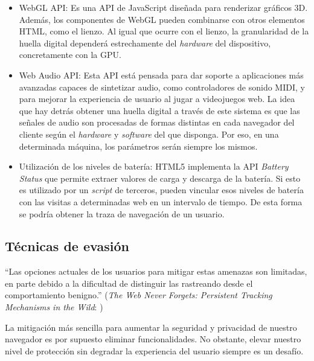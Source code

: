 \begin{itemize}
	\item WebGL API: Es una API de JavaScript diseñada para renderizar gráficos 3D. Además, los componentes de WebGL pueden combinarse con otros elementos HTML, como el lienzo\cite{canvas_paper}. Al igual que ocurre con el lienzo, la granularidad de la huella digital dependerá estrechamente del \textit{hardware} del dispositivo, concretamente con la GPU. \par 
	
	\item Web Audio API\cite{audio_w3c}: Esta API está pensada para dar soporte a aplicaciones más avanzadas capaces de sintetizar audio, como controladores de sonido MIDI, y para mejorar la experiencia de usuario al jugar a videojuegos web. La idea que hay detrás obtener una huella digital a través de este sistema es que las señales de audio son procesadas de formas distintas en cada navegador del cliente según el \textit{hardware} y \textit{software} del que disponga. Por eso, en una determinada máquina, los parámetros serán siempre los mismos. \par 
	
	\item Utilización de los niveles de batería: HTML5 implementa la API \textit{Battery Status} que permite extraer valores de carga y descarga de la batería. Si esto es utilizado por un \textit{script} de terceros, pueden vincular esos niveles de batería con las visitas a determinadas web en un intervalo de tiempo. De esta forma se podría obtener la traza de navegación de un usuario\cite{battery_paper}. \par 
	
\end{itemize}

\subsection{Técnicas de evasión}
``Las opciones actuales de los usuarios para mitigar estas amenazas son limitadas, en parte debido a la dificultad de distinguir las rastreando desde el comportamiento benigno.'' (\textit{The Web Never Forgets: Persistent Tracking Mechanisms in the Wild}: \cite{never_forget_paper}) \par 

La mitigación más sencilla para aumentar la seguridad y privacidad de nuestro navegador es por supuesto eliminar funcionalidades. No obstante, elevar nuestro nivel de protección sin degradar la experiencia del usuario siempre es un desafío. \par 

